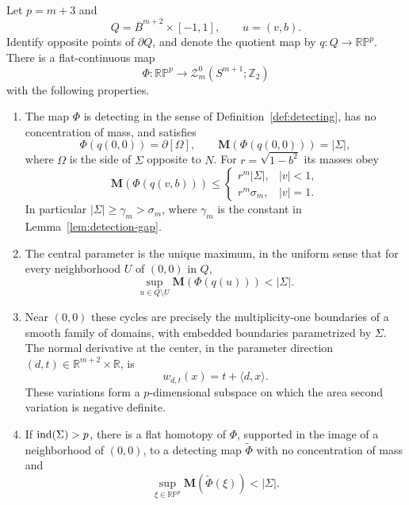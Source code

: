 \begin{proposition}\label{prop:lorentz-family}
Let $p=m+3$ and
\[
 Q=\overline B^{m+2}\times[-1,1],\qquad u=(v,b).
\]
Identify opposite points of $\partial Q$, and denote the quotient map by
$q:Q\longrightarrow\mathbb {RP}^{p}$.  There is a flat-continuous map
\[
 \Phi:\mathbb {RP}^{p}\longrightarrow
 \mathcal Z_m^0(S^{m+1};\mathbb Z_2)
\]
with the following properties.
\begin{enumerate}[label=\textup{(\roman*)}]
\item The map $\Phi$ is detecting in the sense of
Definition~\ref{def:detecting}, has no concentration of mass, and satisfies
\[
 \Phi(q(0,0))=\partial[\Omega],\qquad
 \mathbf M(\Phi(q(0,0)))=|\Sigma|,
\]
where $\Omega$ is the side of $\Sigma$ opposite to $N$.
For $r=\sqrt{1-b^2}$ its masses obey
\begin{equation}\label{eq:family-mass-bounds}
 \mathbf M(\Phi(q(v,b)))\le
 \begin{cases}
  r^m|\Sigma|,& |v|<1,\\
  r^m\sigma_m,& |v|=1.
 \end{cases}
\end{equation}
In particular $|\Sigma|\ge\gamma_m>\sigma_m$, where $\gamma_m$ is the
constant in Lemma~\ref{lem:detection-gap}.
\item The central parameter is the unique maximum, in the uniform sense
that for every neighborhood $U$ of $(0,0)$ in $Q$,
\begin{equation}\label{eq:family-away-gap}
 \sup_{u\in Q\setminus U}\mathbf M(\Phi(q(u)))<|\Sigma|.
\end{equation}
\item Near $(0,0)$ these cycles are precisely the multiplicity-one
boundaries of a smooth family of domains, with embedded boundaries
parametrized by $\Sigma$.  The normal derivative at the center, in the
parameter direction $(d,t)\in\mathbb R^{m+2}\times\mathbb R$, is
\begin{equation}\label{eq:family-normal-variations}
 w_{d,t}(x)=t+\langle d,x\rangle.
\end{equation}
These variations form a $p$-dimensional subspace on which the area second
variation is negative definite.
\item If $\operatorname{ind}(\Sigma)>p$, there is a flat homotopy of $\Phi$, supported
in the image of a neighborhood of $(0,0)$, to a detecting map
$\widetilde\Phi$ with no concentration of mass and
\begin{equation}\label{eq:family-strict-deformation}
 \sup_{\xi\in\mathbb {RP}^{p}}\mathbf M(\widetilde\Phi(\xi))<|\Sigma|.
\end{equation}
\end{enumerate}
\end{proposition}


